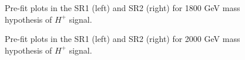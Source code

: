 \begin{figure}[H]
  \centering
  \caption{Pre-fit plots in the SR1 (left) and SR2 (right) for 1800 GeV mass hypothesis of $H^{+}$ signal.}
  \label{fig:Prefit_Hp1800_Asimov}
\end{figure}
\begin{figure}[H]
  \centering
  \caption{Pre-fit plots in the SR1 (left) and SR2 (right) for 2000 GeV mass hypothesis of $H^{+}$ signal.}
  \label{fig:Prefit_Hp2000_Asimov}
\end{figure}

